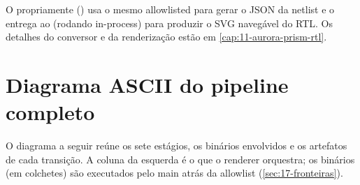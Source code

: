 O  propriamente () usa o mesmo 
allowlisted para gerar o JSON da netlist e o entrega ao 
(rodando in-process) para produzir o SVG navegável do RTL. Os detalhes do
conversor e da renderização estão em \autoref{cap:11-aurora-prism-rtl}.

\section{Diagrama ASCII do pipeline completo}
\label{sec:17-diagrama}

O diagrama a seguir reúne os sete estágios, os binários envolvidos e os artefatos
de cada transição. A coluna da esquerda é o que o renderer orquestra; os binários
(em colchetes) são executados pelo main atrás da allowlist (\autoref{sec:17-fronteiras}).

